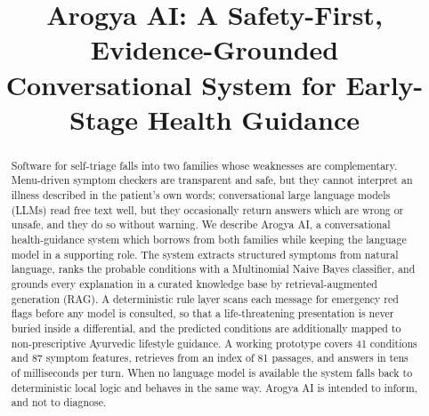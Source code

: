\documentclass[conference]{IEEEtran}
\begin{document}
\title{Arogya AI: A Safety-First, Evidence-Grounded\\
Conversational System for Early-Stage Health Guidance}

\author{
\and
{}
}

\maketitle

\begin{abstract}
Software for self-triage falls into two families whose weaknesses are
complementary. Menu-driven symptom checkers are transparent and safe, but
they cannot interpret an illness described in the patient's own words;
conversational large language models (LLMs) read free text well, but they
occasionally return answers which are wrong or unsafe, and they do so
without warning. We describe Arogya AI, a conversational health-guidance
system which borrows from both families while keeping the language model in
a supporting role. The system extracts structured symptoms from natural
language, ranks the probable conditions with a Multinomial Naive Bayes
classifier, and grounds every explanation in a curated knowledge base by
retrieval-augmented generation (RAG). A deterministic rule layer scans each
message for emergency red flags before any model is consulted, so that a
life-threatening presentation is never buried inside a differential, and the
predicted conditions are additionally mapped to non-prescriptive Ayurvedic
lifestyle guidance. A working prototype covers 41 conditions and 87 symptom
features, retrieves from an index of 81 passages, and answers in tens of
milliseconds per turn. When no language model is available the system falls
back to deterministic local logic and behaves in the same way. Arogya AI is
intended to inform, and not to diagnose.
\end{abstract}
\end{document}
